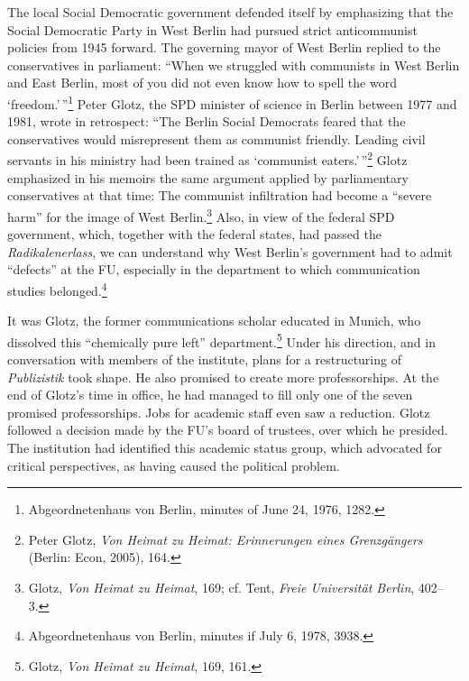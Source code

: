 \documentclass{tufte-handout}
\begin{document}
The local Social Democratic government defended itself by emphasizing
that the Social Democratic Party in West Berlin had pursued strict
anticommunist policies from 1945 forward. The governing mayor of West
Berlin replied to the conservatives in parliament: ``When we struggled
with communists in West Berlin and East Berlin, most of you did not even
know how to spell the word `freedom.'\,''\footnote{Abgeordnetenhaus von
  Berlin, minutes of June 24, 1976, 1282.} Peter Glotz, the SPD minister
of science in Berlin between 1977 and 1981, wrote in retrospect: ``The
Berlin Social Democrats feared that the conservatives would misrepresent
them as communist friendly. Leading civil servants in his ministry had
been trained as `communist eaters.'\,''\footnote{Peter Glotz, \emph{Von
  Heimat zu Heimat: Erinnerungen eines Grenzgängers} (Berlin: Econ,
  2005), 164.} Glotz emphasized in his memoirs the same argument applied
by parliamentary conservatives at that time: The communist infiltration
had become a ``severe harm'' for the image of West Berlin.\footnote{Glotz,
  \emph{Von Heimat zu Heimat}, 169; cf. Tent, \emph{Freie Universität
  Berlin}, 402--3.} Also, in view of the federal SPD government, which,
together with the federal states, had passed the \emph{Radikalenerlass},
we can understand why West Berlin's government had to admit ``defects''
at the FU, especially in the department to which communication studies
belonged.\footnote{Abgeordnetenhaus von Berlin, minutes if July 6, 1978,
  3938.}

It was Glotz, the former communications scholar educated in Munich, who
dissolved this ``chemically pure left'' department.\footnote{Glotz,
  \emph{Von Heimat zu Heimat}, 169, 161.} Under his direction, and in
conversation with members of the institute, plans for a restructuring of
\emph{Publizistik} took shape. He also promised to create more
professorships. At the end of Glotz's time in office, he had managed to
fill only one of the seven promised professorships. Jobs for academic
staff even saw a reduction. Glotz followed a decision made by the FU's
board of trustees, over which he presided. The institution had
identified this academic status group, which advocated for critical
perspectives, as having caused the political problem.
\end{document}
